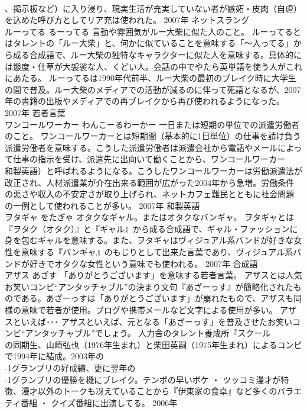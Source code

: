 \documentclass[8pt]{extreport}
\begin{document}
\begin{CJK}{UTF8}{min}
\\	、掲示板など）に入り浸り、現実生活が充実していない者が嫉妬・皮肉（自虐）を込めた呼び方としてリア充は使われた。	2007年	ネットスラング	
\\	ルーってる	るーってる	言動や雰囲気がルー大柴に似た人のこと。	ルーってるとはタレントの「ルー大柴」と、何かに似ていることを意味する「～入ってる」から成る合成語で、ルー大柴の独特なキャラクターに似た人を意味する。具体的には態度・仕草が大袈裟な人、くどい人。会話の中でやたら英単語を使う人がこれにあたる。 ルーってるは1990年代前半、ルー大柴の最初のブレイク時に大学生の間で普及。ルー大柴のメディアでの活動が減るのに伴って死語となるが、2007年の書籍の出版やメディアでの再ブレイクから再び使われるようになった。	2007年	若者言葉	
\\	ワンコールワーカー	わんこーるわーかー	一日または短期の単位での派遣労働者のこと。	ワンコールワーカーとは短期間（基本的に1日単位）の仕事を請け負う派遣労働者を意味する。こうした派遣労働者は派遣会社から電話やメールによって仕事の指示を受け、派遣先に出向いて働くことから、ワンコールワーカー
\\	和製英語）と呼ばれるようになる。こうしたワンコールワーカーは労働派遣法が改正され、人材派遣業が介在出来る範囲が広がった2004年から急増。労働条件の悪さや収入の不安定さが取り上げられ、ネットカフェ難民とともに社会問題の一例として使われることが多い。	2007年	和製英語	
\\	ヲタギャ	をたぎゃ	オタクなギャル。またはオタクなバンギャ。	ヲタギャとは『ヲタク（オタク）』と『ギャル』から成る合成語で、ギャル・ファッションに身を包むギャルを意味する。また、ヲタギャはヴィジュアル系バンドが好きな女性を意味する『バンギャ』のもじりとして出来た言葉であり、ヴィジュアル系バンドが好きでオタクな女性という意味でも使われる。	2007年	合成語	
\\	アザス	あざす	「ありがとうございます」を意味する若者言葉。	アザスとは人気お笑いコンビ“アンタッチャブル”の決まり文句『あざーっす』が簡略化されたものである。あざーっすは「ありがとうございます」が崩れたもので、アザスも同様の意味で若者が使用。ブログや携帯メールなど文字による使用が多い。 アザスといえば･･･ アザスといえば、元となる「あざーっす」を普及させたお笑いコンビ“アンタッチャブル”でしょう。 人力舎のタレント養成所『スクール
\\	の同期生、山崎弘也（1976年生まれ）と柴田英嗣（1975年生まれ）によるコンビで1994年に結成。2003年の
\\	-1グランプリの好成績、更に翌年の
\\	-1グランプリの優勝を機にブレイク。テンポの早いボケ ・ ツッコミ漫才が特徴、漫才以外のトークも冴えていることから『伊東家の食卓』など多くのバラエティ番組 ・ クイズ番組に出演してる。	2006年	

\end{CJK}
\end{document}
